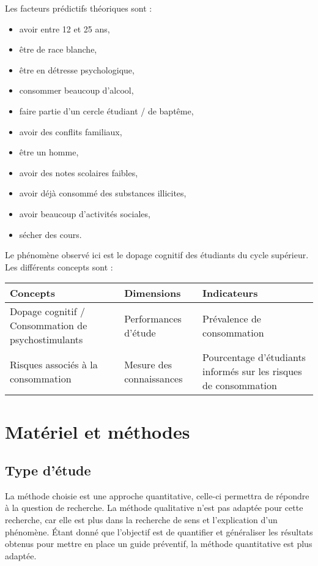 \guillemotleft Les facteurs prédictifs théoriques sont :
\begin{itemize}
    \item avoir entre 12 et 25 ans,
    \item être de race blanche,
    \item être en détresse psychologique,
    \item consommer beaucoup d'alcool,
    \item faire partie d'un cercle étudiant / de baptême,
    \item avoir des conflits familiaux,
    \item être un homme,
    \item avoir des notes scolaires faibles,
    \item avoir déjà consommé des substances illicites,
    \item avoir beaucoup d'activités sociales,
    \item sécher des cours.  \guillemotright \newline
\end{itemize}



Le phénomène observé ici est le dopage cognitif des étudiants du cycle supérieur. Les différents concepts sont : \newline

\begin{tabularx}{\textwidth}{| X | X | X |}
    \hline
    \textbf{Concepts} & \textbf{Dimensions} & \textbf{Indicateurs} \\
    \hline \hline
    Dopage cognitif / Consommation de psychostimulants & Performances d'étude & Prévalence de consommation \\
    \hline
    Risques associés à la consommation & Mesure des connaissances & Pourcentage d'étudiants informés sur les risques de consommation \\
    \hline
\end{tabularx}




\chapter{Matériel et méthodes}
\section{Type d'étude}
La méthode choisie est une approche quantitative, celle-ci permettra de
répondre à la question de recherche. La méthode qualitative n'est pas adaptée pour cette recherche, car elle est plus dans la recherche de sens et l’explication d’un phénomène. Étant donné que l'objectif est de quantifier et généraliser les résultats obtenus pour mettre en place un guide préventif, la méthode quantitative est plus adaptée.


